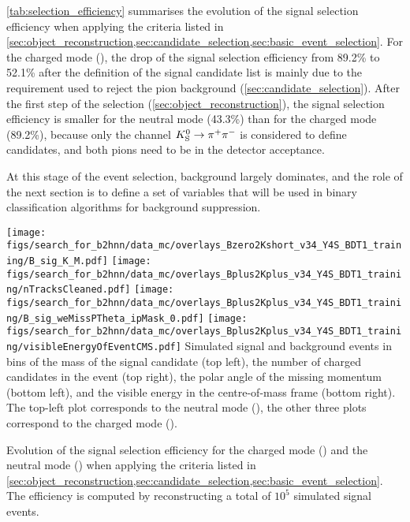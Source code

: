 \ei 
\cref{tab:selection_efficiency} summarises the evolution of the signal selection efficiency when applying the criteria listed in \cref{sec:object_reconstruction,sec:candidate_selection,sec:basic_event_selection}.
For the charged mode (\BKpnn), the drop of the signal selection efficiency from 89.2\% to 52.1\% after the definition of the signal candidate list is mainly due to the \PID requirement used to reject the pion background (\cref{sec:candidate_selection}).
After the first step of the selection (\cref{sec:object_reconstruction}), the signal selection efficiency is smaller for the neutral mode (43.3\%) than for the charged mode (89.2\%), because only the channel $K^0_{\mathrm{S}}\rightarrow\pi^+\pi^-$ is considered to define \KS candidates, and both pions need to be in the detector acceptance.

At this stage of the event selection, background largely dominates, and the role of the next section is to define a set of variables that will be used in binary classification algorithms for background suppression.

{
\texttt{[image: figs/search\_for\_b2hnn/data\_mc/overlays\_Bzero2Kshort\_v34\_Y4S\_BDT1\_training/B\_sig\_K\_M.pdf]}
\texttt{[image: figs/search\_for\_b2hnn/data\_mc/overlays\_Bplus2Kplus\_v34\_Y4S\_BDT1\_training/nTracksCleaned.pdf]}
\texttt{[image: figs/search\_for\_b2hnn/data\_mc/overlays\_Bplus2Kplus\_v34\_Y4S\_BDT1\_training/B\_sig\_weMissPTheta\_ipMask\_0.pdf]}
\texttt{[image: figs/search\_for\_b2hnn/data\_mc/overlays\_Bplus2Kplus\_v34\_Y4S\_BDT1\_training/visibleEnergyOfEventCMS.pdf]}
}
{
Simulated signal and background events in bins of the mass of the signal \KS candidate (top left), the number of charged candidates in the event (top right), the polar angle of the missing momentum (bottom left), and the visible energy in the centre-of-mass frame (bottom right).
The top-left plot corresponds to the neutral mode (\BKznn), the other three plots correspond to the charged mode (\BKpnn).
\overlaytext
}

{
Evolution of the signal selection efficiency for the charged mode (\BKpnn) and the neutral mode (\BKznn) when applying the criteria listed in \cref{sec:object_reconstruction,sec:candidate_selection,sec:basic_event_selection}.
The efficiency is computed by reconstructing a total of $10^5$ simulated signal events.
}
\clearpage
